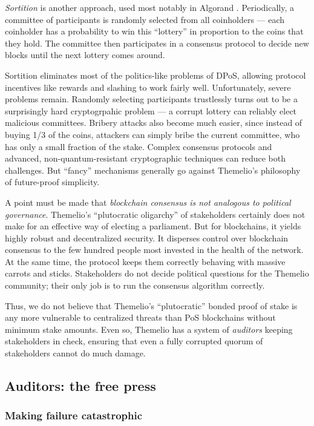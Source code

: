 \documentclass[headinclude]{scrbook}
\begin{document}
\textit{Sortition} is another approach, used most notably in Algorand \cite{gilad2017algorand}. Periodically, a committee of participants is randomly selected from all coinholders --- each coinholder has a probability to win this ``lottery'' in proportion to the coins that they hold. The committee then participates in a consensus protocol to decide new blocks until the next lottery comes around.

Sortition eliminates most of the politics-like problems of DPoS, allowing protocol incentives like rewards and slashing to work fairly well. Unfortunately, severe problems remain. Randomly selecting participants trustlessly turns out to be a surprisingly hard cryptogrpahic problem --- a corrupt lottery can reliably elect malicious committees. Bribery attacks also become much easier, since instead of buying 1/3 of the coins, attackers can simply bribe the current committee, who has only a small fraction of the stake. Complex consensus protocols and advanced, non-quantum-resistant cryptographic techniques can reduce both challenges. But ``fancy'' mechanisms generally go against Themelio's philosophy of future-proof simplicity.

A point must be made that \textit{blockchain consensus is not analogous to political governance}. Themelio's ``plutocratic oligarchy'' of stakeholders certainly does not make for an effective way of electing a parliament. But for blockchains, it yields highly robust and decentralized security. It disperses control over blockchain consensus to the few hundred people most invested in the health of the network. At the same time, the protocol keeps them correctly behaving with massive carrots and sticks. Stakeholders do not decide political questions for the Themelio community; their only job is to run the consensus algorithm correctly.

Thus, we do not believe that Themelio's ``plutocratic'' bonded proof of stake is any more vulnerable to centralized threats than PoS blockchains without minimum stake amounts. Even so, Themelio has a system of \textit{auditors} keeping stakeholders in check, ensuring that even a fully corrupted quorum of stakeholders cannot do much damage.

\subsection{Auditors: the free press}

\subsubsection{Making failure catastrophic}
\end{document}
